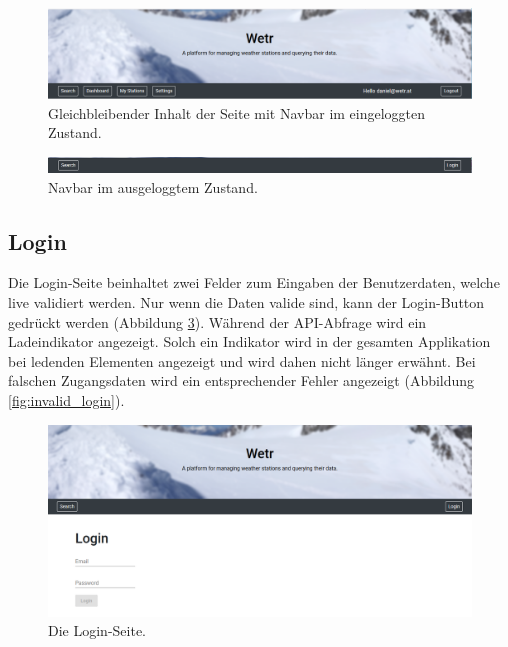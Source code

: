 \documentclass[12pt, letterpaper]{article}
\begin{document}
\begin{figure}[H]
    \centering
    \includegraphics[width=\textwidth]{img/app/navbar.png}
    \caption{Gleichbleibender Inhalt der Seite mit Navbar im eingeloggten Zustand.}
    \label{fig:navbar_loggedIn}
\end{figure}


\begin{figure}[H]
    \centering
    \includegraphics[width=\textwidth]{img/app/navbar_loggedOut.png}
    \caption{Navbar im ausgeloggtem Zustand.}
    \label{fig:navbar_loggedOut}
\end{figure}


\subsection{Login}

Die Login-Seite beinhaltet zwei Felder zum Eingaben der Benutzerdaten, welche live validiert werden. Nur wenn die Daten valide sind, kann der Login-Button gedrückt werden (Abbildung \ref{fig:login_page}). Während der API-Abfrage wird ein Ladeindikator angezeigt. Solch ein Indikator wird in der gesamten Applikation bei ledenden Elementen angezeigt und wird dahen nicht länger erwähnt. Bei falschen Zugangsdaten wird ein entsprechender Fehler angezeigt  (Abbildung \ref{fig:invalid_login}).


\begin{figure}[H]
    \centering
    \includegraphics[width=\textwidth]{img/login/login.png}
    \caption{Die Login-Seite.}
    \label{fig:login_page}
\end{figure}
\end{document}
